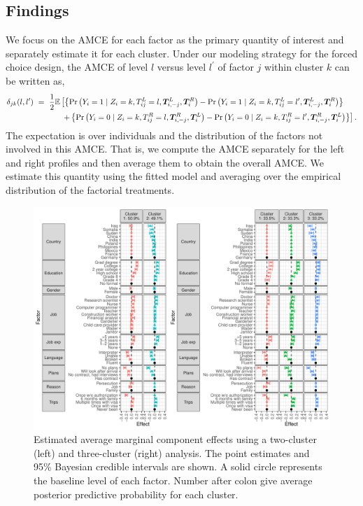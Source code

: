 \documentclass[11pt]{article}
\newcommand\E{\mathbb{E}}
\newcommand\bT{\bm{T}}
\newcommand\spacingset[1]{\renewcommand{\baselinestretch}%
  {#1}\small\normalsize}
\begin{document}
\subsection{Findings}

We focus on the AMCE for each factor as the primary quantity of
interest and separately estimate it for each cluster.  Under our
modeling strategy for the forced choice design, the AMCE of level $l$
versus level $l^\prime$ of factor $j$ within cluster $k$ can be
written as,
\begin{align*}
\delta_{jk}(l, l^\prime) & \ = \ \frac{1}{2}\E \left[
                         \left\{\Pr\left(Y_i = 1 \mid Z_i=k, T^L_{ij}=l,
                         \bT^L_{i,-j}, \bT^R_{i}\right) -
                         \Pr\left(Y_i = 1 \mid Z_i=k, T^L_{ij}=l^\prime,
                         \bT^L_{i,-j}, \bT^R_{i}\right)
                         \right\}\right. \\
  & \hspace{.5in} \left.
                         +\left\{\Pr\left(Y_i = 0 \mid Z_i=k, T^R_{ij}=l,
                         \bT^R_{i,-j}, \bT^L_{i}\right) -
                         \Pr\left(Y_i = 0 \mid Z_i=k, T^R_{ij}=l^\prime,
                         \bT^R_{i,-j}, \bT^L_{i}\right)
    \right\}\right]. 
\end{align*}
The expectation is over individuals and the distribution of the factors not involved in this AMCE.
That is, we compute the AMCE separately for the left and right
profiles and then average them to obtain the overall AMCE.  We
estimate this quantity using the fitted model and averaging over the
empirical distribution of the factorial treatments. 

\begin{figure}[t!]
\centering \spacingset{1}
\includegraphics[width=\textwidth]{figures/AME_plot.pdf}
\caption{Estimated average marginal component effects using a
  two-cluster (left) and three-cluster (right) analysis. The point
  estimates and 95\% Bayesian credible intervals are shown. A solid
  circle represents the baseline level of each factor.  Number after
  colon give average posterior predictive probability for each
  cluster.} \label{fig:ame}
\end{figure}
\end{document}
